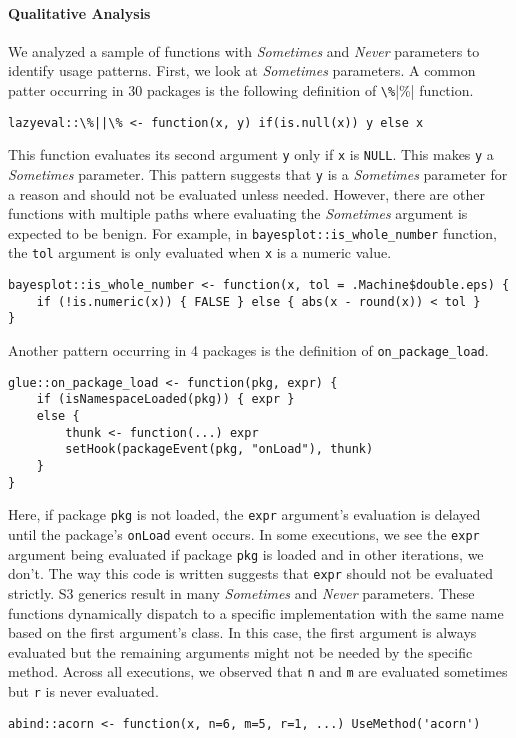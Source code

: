 \documentclass[review,nonacm,screen,acmsmall,anonymous=true]{acmart}
\newcommand{\sometimes}{\emph{Sometimes}\xspace}
\newcommand{\never}{\emph{Never}\xspace}
\newcommand{\code}[1]{\lstinline |#1|\xspace}
\begin{document}
\paragraph{Qualitative Analysis}

We analyzed a sample of functions with \sometimes and \never parameters to
identify usage patterns.
%
First, we look at \sometimes parameters. A common patter occurring in 30
packages is the following definition of \code{\%||\%} function.
%
\begin{lstlisting}
lazyeval::\%||\% <- function(x, y) if(is.null(x)) y else x
\end{lstlisting}
%
This function evaluates its second argument \code{y} only if \code{x} is
\code{NULL}. This makes \code{y} a \sometimes parameter. This pattern suggests
that \code{y} is a \sometimes parameter for a reason and should not be evaluated
unless needed. However, there are other functions with multiple paths where
evaluating the \sometimes argument is expected to be benign. For example, in
\code{bayesplot::is_whole_number} function, the \code{tol} argument is only
evaluated when \code{x} is a numeric value.
%
\begin{lstlisting}
bayesplot::is_whole_number <- function(x, tol = .Machine$double.eps) {
    if (!is.numeric(x)) { FALSE } else { abs(x - round(x)) < tol }
}
\end{lstlisting}

Another pattern occurring in 4 packages is the definition of
\code{on_package_load}.

\begin{lstlisting}
glue::on_package_load <- function(pkg, expr) {
    if (isNamespaceLoaded(pkg)) { expr }
    else {
        thunk <- function(...) expr
        setHook(packageEvent(pkg, "onLoad"), thunk)
    }
}
\end{lstlisting}
%
Here, if package \code{pkg} is not loaded, the \code{expr} argument's evaluation
is delayed until the package's \code{onLoad} event occurs. In some executions,
we see the \code{expr} argument being evaluated if package \code{pkg} is loaded
and in other iterations, we don't. The way this code is written suggests that
\code{expr} should not be evaluated strictly.
%
S3 generics result in many \sometimes and \never parameters. These functions
dynamically dispatch to a specific implementation with the same name based on
the first argument's class. In this case, the first argument is always evaluated
but the remaining arguments might not be needed by the specific method. Across
all executions, we observed that \code{n} and \code{m} are evaluated sometimes
but \code{r} is never evaluated.
%
\begin{lstlisting}
abind::acorn <- function(x, n=6, m=5, r=1, ...) UseMethod('acorn')
\end{lstlisting}
\end{document}
